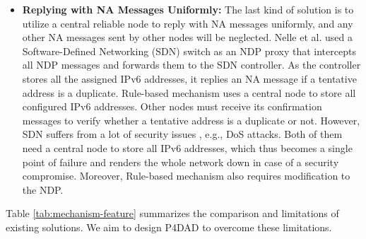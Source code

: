 \documentclass[a4paper,fleqn]{cas-dc}
\begin{document}
\begin{itemize}
        \item\textbf{Replying with NA Messages Uniformly:}
            The last kind of solution is to utilize a central reliable node to reply with NA messages uniformly, and any other NA messages sent by other nodes will be neglected. Nelle et al. \cite{ndp-proxy} used a Software-Defined Networking (SDN) switch as an NDP proxy that intercepts all NDP messages and forwards them to the SDN controller. As the controller stores all the assigned IPv6 addresses, it replies an NA message if a tentative address is a duplicate. Rule-based mechanism \cite{Controller-Scheme} uses a central node to store all configured IPv6 addresses. Other nodes must receive its confirmation messages to verify whether a tentative address is a duplicate or not. However, SDN suffers from a lot of security issues \cite{DBLP:conf/sdn4fns/Scott-HaywardOS13,DBLP:journals/comsur/Scott-HaywardNS16,DBLP:journals/comsur/AhmadNYG15}, e.g., DoS attacks. Both of them need a central node to store all IPv6 addresses, which thus becomes a single point of failure and renders the whole network down in case of a security compromise. Moreover, Rule-based mechanism also requires modification to the NDP.
        \end{itemize}

        Table \ref{tab:mechanism-feature} summarizes the comparison and limitations of existing solutions. We aim to design P4DAD to overcome these limitations.
            
\end{document}
